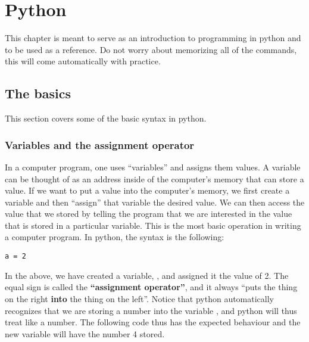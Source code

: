 %
\chapter{Python}
This chapter is meant to serve as an introduction to programming in python and to be used as a reference. Do not worry about memorizing all of the commands, this will come automatically with practice.

\section{The basics}
This section covers some of the basic syntax in python.
\subsection{Variables and the assignment operator}
In a computer program, one uses ``variables'' and assigns them values. A variable can be thought of as an address inside of the computer's memory that can store a value. If we want to put a value into the computer's memory, we first create a variable and then ``assign'' that variable the desired value. We can then access the value that we stored by telling the program that we are interested in the value that is stored in a particular variable. This is the most basic operation in writing a computer program. In python, the syntax is the following:
\begin{lstlisting}[frame=single] 
a = 2 
\end{lstlisting}

In the above, we have created a variable, , and assigned it the value of 2. The equal sign is called the \textbf{``assignment operator''}, and it always ``puts the thing on the right \textbf{into} the thing on the left''. Notice that python automatically recognizes that we are storing a number into the variable , and python will thus treat  like a number. The following code thus has the expected behaviour and the new variable  will have the number 4 stored.

